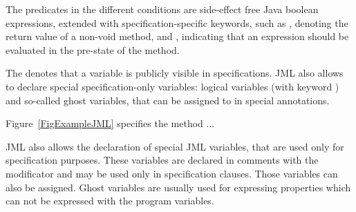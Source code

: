 The predicates in the different conditions are side-effect free Java
boolean expressions, extended with specification-specific keywords,
such as , denoting the return value of a non-void
method, and , indicating that an expression should be
evaluated in the pre-state of the method.

The  denotes that a variable is publicly
visible in specifications. JML also allows to declare special
specification-only variables: logical variables (with keyword
) and so-called ghost variables, that can be assigned to
in special  annotations.

Figure~\ref{FigExampleJML} specifies the method ... 
     


JML also allows the declaration of special JML variables, that are
used only for specification purposes. These variables are declared in
comments with the  modificator and may be used only in
specification clauses. Those variables can also be assigned. Ghost
variables are usually used for expressing properties which can not be
expressed with the program variables.

